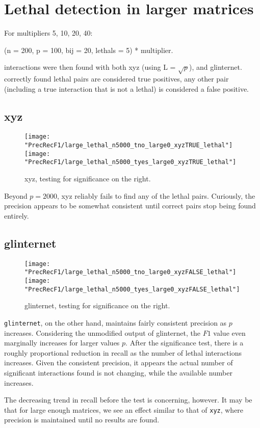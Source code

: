 \documentclass{article}
\begin{document}
\section{Lethal detection in larger matrices}
For multipliers 5, 10, 20, 40:

(n = 200, p = 100, bij = 20, lethals = 5) * multiplier.

interactions were then found with both xyz (using L = $\sqrt{p}$), and glinternet. correctly found lethal pairs are considered true positives, any other pair (including a true interaction that is not a lethal) is considered a false positive.
\subsection{xyz}
\begin{figure}[H]
\begin{minipage}{\linewidth}
	\centering
	\texttt{[image: "PrecRecF1/large\_lethal\_n5000\_tno\_large0\_xyzTRUE\_lethal"]}%
	\texttt{[image: "PrecRecF1/large\_lethal\_n5000\_tyes\_large0\_xyzTRUE\_lethal"]}
\end{minipage}
\caption{xyz, testing for significance on the right.}
\end{figure}

Beyond $p = 2000$, xyz reliably fails to find any of the lethal pairs. Curiously, the precision appears to be somewhat consistent until correct pairs stop being found entirely.

\subsection{glinternet}
\begin{figure}[H]
\begin{minipage}{\linewidth}
	\centering
	\texttt{[image: "PrecRecF1/large\_lethal\_n5000\_tno\_large0\_xyzFALSE\_lethal"]}%
	\texttt{[image: "PrecRecF1/large\_lethal\_n5000\_tyes\_large0\_xyzFALSE\_lethal"]}
\end{minipage}
\caption{glinternet, testing for significance on the right.}
\end{figure}
\verb|glinternet|, on the other hand, maintains fairly consistent precision as $p$ increases. Considering the unmodified output of glinternet, the $F1$ value even marginally increases for larger values $p$. After the significance test, there is a roughly proportional reduction in recall as the number of lethal interactions increases. Given the consistent precision, it appears the actual number of significant interactions found is not changing, while the available number increases.

The decreasing trend in recall before the test is concerning, however. It may be that for large enough matrices, we see an effect similar to that of \verb|xyz|, where precision is maintained until no results are found.
\end{document}
